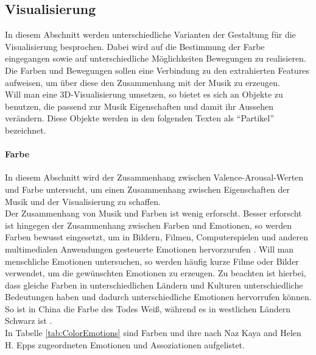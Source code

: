\documentclass[11pt,a4paper]{article}
\begin{document}
\subsection{Visualisierung}
In diesem Abschnitt werden unterschiedliche Varianten der Gestaltung für die Visualisierung besprochen. Dabei wird auf die Bestimmung der Farbe eingegangen sowie auf unterschiedliche Möglichkeiten Bewegungen zu realisieren. Die Farben und Bewegungen sollen eine Verbindung zu den extrahierten Features aufweisen, um über diese den Zusammenhang mit der Musik zu erzeugen.\\
Will man eine 3D-Visualisierung umsetzen, so bietet es sich an Objekte zu benutzen, die passend zur Musik Eigenschaften
und damit ihr Aussehen verändern. Diese Objekte werden in den folgenden Texten als ``Partikel'' bezeichnet.

\paragraph{Farbe}
\label{sec:Farbzuordnung}
In diesem Abschnitt wird der Zusammenhang zwischen Valence-Arousal-Werten und Farbe untersucht, um einen Zusammenhang zwischen Eigenschaften der Musik und der Visualisierung zu schaffen.\\
Der Zusammenhang von Musik und Farben ist wenig erforscht. Besser erforscht ist hingegen der Zusammenhang zwischen Farben und Emotionen, so werden Farben bewusst eingesetzt, um in Bildern, Filmen, Computerspielen und anderen multimedialen Anwendungen gesteuerte Emotionen hervorzurufen \cite{10.3389/fpsyg.2017.00440}. Will man menschliche Emotionen untersuchen, so werden häufig kurze Filme oder Bilder verwendet, um die gewünschten Emotionen zu erzeugen. Zu beachten ist hierbei, dass gleiche Farben in unterschiedlichen Ländern und Kulturen unterschiedliche Bedeutungen haben und dadurch unterschiedliche Emotionen hervorrufen können. So ist in China die Farbe des Todes Weiß, während es in westlichen Ländern Schwarz ist  \cite[S. 3]{c0f471f7e6a618d880cf25175c9f99ac97ef8ba7d016c7f8c523f8d902892d9e}.\\
In Tabelle \ref{tab:ColorEmotions} sind Farben und ihre nach Naz Kaya and Helen H. Epps
 \cite{c0f471f7e6a618d880cf25175c9f99ac97ef8ba7d016c7f8c523f8d902892d9e} zugeordneten Emotionen und Assoziationen aufgelistet.
\end{document}
